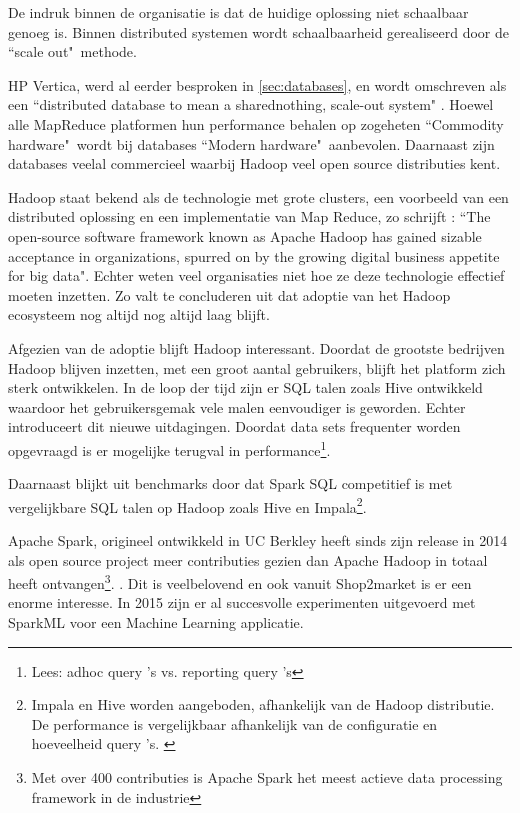 De indruk binnen de organisatie is dat de huidige oplossing niet schaalbaar genoeg is. Binnen distributed systemen wordt schaalbaarheid gerealiseerd door de ``scale out"\ methode.


HP Vertica, werd al eerder besproken in \ref{sec:databases}, en wordt omschreven als een ``distributed database to mean a sharednothing, scale-out system" \parencite{lamb2012vertica}. Hoewel alle MapReduce platformen hun performance behalen op zogeheten ``Commodity hardware"\ wordt bij databases ``Modern hardware"\ aanbevolen. Daarnaast zijn databases veelal commercieel waarbij Hadoop veel open source distributies kent. \parencite{dean2008mapreduce}

Hadoop staat bekend als de technologie met grote clusters, een voorbeeld van een distributed oplossing en een implementatie van Map Reduce, zo schrijft \textcite{hadoop2013selection}: ``The open-source software framework known as Apache Hadoop has gained sizable acceptance in organizations, spurred on by the growing digital business appetite for big data". Echter weten veel organisaties niet hoe ze deze technologie effectief moeten inzetten. Zo valt te concluderen uit \textcite{hadoop2015adoption} dat adoptie van het Hadoop ecosysteem nog altijd nog altijd laag blijft.

Afgezien van de adoptie blijft Hadoop interessant. Doordat de grootste bedrijven Hadoop blijven inzetten, met een groot aantal gebruikers, blijft het platform zich sterk ontwikkelen. In de loop der tijd zijn er SQL talen zoals Hive ontwikkeld waardoor het gebruikersgemak vele malen eenvoudiger is geworden. Echter introduceert dit nieuwe uitdagingen. Doordat data sets frequenter worden opgevraagd is er mogelijke terugval in performance\footnote{Lees: adhoc query 's vs. reporting query 's}. \parencite{thusoo2010hive}

Daarnaast blijkt uit benchmarks door \textcite{armbrust2015spark} dat Spark SQL competitief is met vergelijkbare SQL talen op Hadoop zoals Hive en Impala\footnote{Impala en Hive worden aangeboden, afhankelijk van de Hadoop distributie. De performance is vergelijkbaar afhankelijk van de configuratie en hoeveelheid query 's. \parencite{hortonworks_benchmark}}.

Apache Spark, origineel ontwikkeld in UC Berkley heeft sinds zijn release in 2014 als open source project meer contributies gezien dan Apache Hadoop in totaal heeft ontvangen\footnote{Met over 400 contributies is Apache Spark het meest actieve data processing framework in de industrie}. \parencite{armbrust2015spark}. Dit is veelbelovend en ook vanuit Shop2market is er een enorme interesse. In 2015 zijn er al succesvolle experimenten uitgevoerd met SparkML voor een Machine Learning applicatie.

